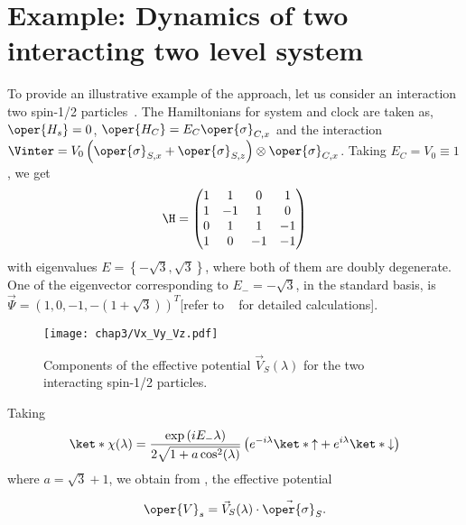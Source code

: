 \section{Example: Dynamics of two interacting two level system\label{sec:chap3_2spin_interact}}

To provide an illustrative example of the approach, let us consider an interaction two spin-1/2 particles~\cite{Gemsheim:2023izg}.
The Hamiltonians for system and clock are taken as, \(\oper{H_s} = 0\), \(\oper{H_C} = E_C\oper{\sigma}_{C, x}\)
and the interaction 
\(\Vinter = V_0\left(\oper{\sigma}_{S, x} + \oper{\sigma}_{S, z}\right)\otimes \oper{\sigma}_{C, x}\). 
Taking \(E_C = V_0 \equiv 1\), we get
\begin{equation}
    \H = \begin{pmatrix}
        1 & 1 & 0 & 1 \\
        1 & -1 & 1 & 0 \\
        0 & 1 & 1 & -1 \\
        1 & 0 & -1 & -1
        \end{pmatrix}
\end{equation}
with eigenvalues \(E = \left\{-\sqrt{3}, \sqrt{3}\right\}\), 
where both of them are doubly degenerate. One of the eigenvector
corresponding to \(E_- = -\sqrt{3}\), in the standard basis, is
\(\vec{\Psi} = \left(1, 0, -1, -(1 + \sqrt{3})\right)^T\)[refer to ~ for detailed calculations].
\begin{figure}[!h]
    \centering
    \texttt{[image: chap3/Vx\_Vy\_Vz.pdf]}
    \caption{Components of the effective potential \(\vec{V}_S(\lambda)\) for the two interacting spin-1/2 particles.}
    \label{fig:chap3_effective_potential}
\end{figure}


Taking
\begin{equation}
    \ket*{\chi(\lambda)} = 
    \frac{\exp\left(i E_- \lambda\right)}{
        2\sqrt{1 + a \cos^2(\lambda)}} \left(e^{-i\lambda} \ket*{\uparrow} + e^{i\lambda} \ket*{\downarrow} \right)
\end{equation} 
where \(a = \sqrt{3} + 1\), we obtain from , the effective potential

\begin{equation}
    \oper{V}_s = \vec{V}_S(\lambda)\cdot\vec{\oper{\sigma}}_S. 
\end{equation}

